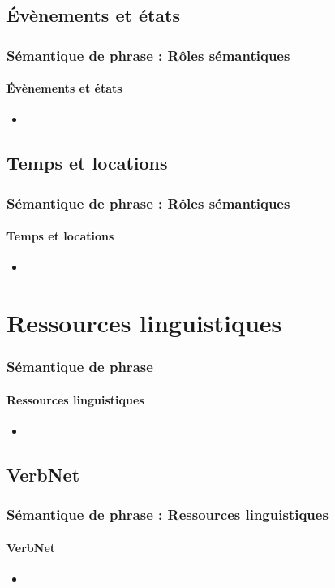 \documentclass[xcolor=table]{beamer}
\begin{document}
\subsection{Évènements et états}

\begin{frame}
	\frametitle{Sémantique de phrase : Rôles sémantiques}
	\framesubtitle{Évènements et états}
	
	\begin{itemize}
		\item 
	\end{itemize}
	
\end{frame}

\subsection{Temps et locations}

\begin{frame}
	\frametitle{Sémantique de phrase : Rôles sémantiques}
	\framesubtitle{Temps et locations}
	
	\begin{itemize}
		\item 
	\end{itemize}
	
\end{frame}

\section{Ressources linguistiques}

\begin{frame}
	\frametitle{Sémantique de phrase}
	\framesubtitle{Ressources linguistiques}
	
	\begin{itemize}
		\item 
	\end{itemize}
	
\end{frame}

\subsection{VerbNet}

\begin{frame}
	\frametitle{Sémantique de phrase : Ressources linguistiques}
	\framesubtitle{VerbNet}
	
	\begin{itemize}
		\item 
	\end{itemize}
	
\end{frame}
\end{document}
